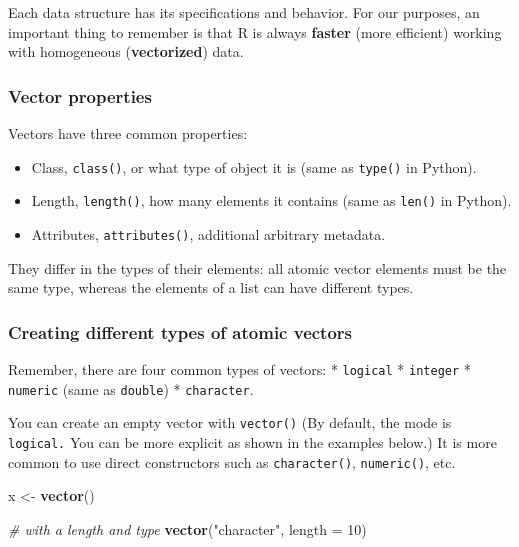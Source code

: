 \documentclass[
]{book}
\newenvironment{Shaded}{\begin{snugshade}}{\end{snugshade}}
\newcommand{\CommentTok}[1]{\textcolor[rgb]{0.56,0.35,0.01}{\textit{#1}}}
\newcommand{\DataTypeTok}[1]{\textcolor[rgb]{0.13,0.29,0.53}{#1}}
\newcommand{\DecValTok}[1]{\textcolor[rgb]{0.00,0.00,0.81}{#1}}
\newcommand{\KeywordTok}[1]{\textcolor[rgb]{0.13,0.29,0.53}{\textbf{#1}}}
\newcommand{\NormalTok}[1]{#1}
\newcommand{\StringTok}[1]{\textcolor[rgb]{0.31,0.60,0.02}{#1}}
\providecommand{\tightlist}{%
  \setlength{\itemsep}{0pt}\setlength{\parskip}{0pt}}
\begin{document}
Each data structure has its specifications and behavior. For our purposes, an important thing to remember is that R is always \textbf{faster} (more efficient) working with homogeneous (\textbf{vectorized}) data.

\hypertarget{vector-properties}{%
\subsubsection{Vector properties}\label{vector-properties}}

Vectors have three common properties:

\begin{itemize}
\tightlist
\item
  Class, \texttt{class()}, or what type of object it is (same as \texttt{type()} in Python).
\item
  Length, \texttt{length()}, how many elements it contains (same as \texttt{len()} in Python).
\item
  Attributes, \texttt{attributes()}, additional arbitrary metadata.
\end{itemize}

They differ in the types of their elements: all atomic vector elements must be the same type, whereas the elements of a list can have different types.

\hypertarget{creating-different-types-of-atomic-vectors}{%
\subsubsection{Creating different types of atomic vectors}\label{creating-different-types-of-atomic-vectors}}

Remember, there are four common types of vectors:
* \texttt{logical}
* \texttt{integer}
* \texttt{numeric} (same as \texttt{double})
* \texttt{character}.

You can create an empty vector with \texttt{vector()} (By default, the mode is \texttt{logical.} You can be more explicit as shown in the examples below.) It is more common to use direct constructors such as \texttt{character()}, \texttt{numeric()}, etc.

\begin{Shaded}
\begin{Highlighting}[]
\NormalTok{x \textless{}{-}}\StringTok{ }\KeywordTok{vector}\NormalTok{()}

\CommentTok{\# with a length and type}
\KeywordTok{vector}\NormalTok{(}\StringTok{"character"}\NormalTok{, }\DataTypeTok{length =} \DecValTok{10}\NormalTok{)}
\end{Highlighting}
\end{Shaded}
\end{document}
